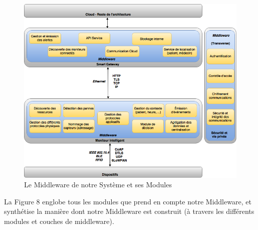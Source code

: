 \begin{figure}[h!]
	\hspace*{-1cm}
	\centering
	\includegraphics[width=1.1\textwidth]{Figure8.png}
	\caption{Le Middleware de notre Système et ses Modules}
	\label{fig:balance}
\end{figure}

La Figure 8 englobe tous les modules que prend en compte notre Middleware, et synthétise la manière dont notre Middleware est construit (à travers les différents modules et couches de middleware).